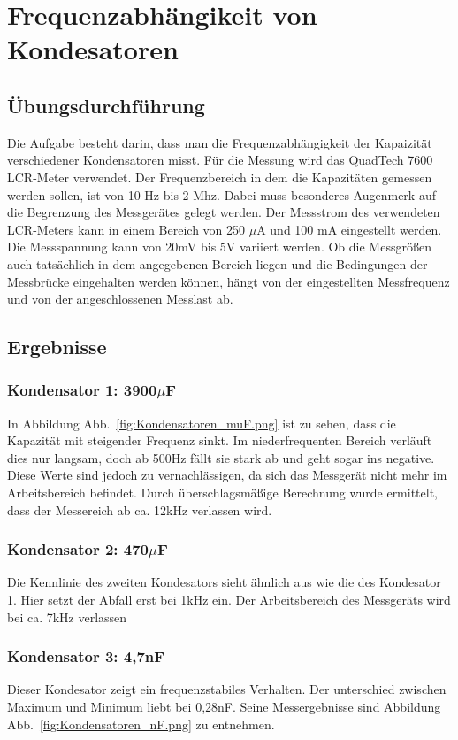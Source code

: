 \documentclass[a4paper,twoside,12pt,DIV=13,BCOR=5mm,numbers=noenddot,cleardoublepage=empty]{scrbook}
\begin{document}
    \section{Frequenzabh\"angikeit von Kondesatoren}
    \subsection{\"Ubungsdurchf\"uhrung}
    Die Aufgabe besteht darin, dass man die Frequenzabh\"angigkeit der Kapaizit\"at verschiedener Kondensatoren misst.
    F\"ur die Messung wird das QuadTech 7600 LCR-Meter verwendet. Der 
    Frequenzbereich in dem die Kapazit\"aten gemessen werden sollen, 
    ist von 10 Hz bis 2 Mhz. Dabei muss besonderes Augenmerk auf die 
    Begrenzung des Messger\"ates gelegt werden. Der Messstrom des verwendeten 
    LCR-Meters kann in einem Bereich von 250 $\mu$A und 100 mA eingestellt 
    werden. Die Messspannung kann von 20mV bis 5V variiert werden. Ob die 
    Messgr\"o\ss{}en auch tats\"achlich in dem angegebenen Bereich liegen und die 
    Bedingungen der Messbr\"ucke eingehalten werden k\"onnen, h\"angt von der
    eingestellten Messfrequenz und von der angeschlossenen Messlast ab.
    
    \subsection{Ergebnisse}
    \subsubsection{Kondensator 1: 3900$\mu$F }
    In Abbildung Abb.~\ref{fig:Kondensatoren_muF.png} ist zu sehen, dass die Kapazit\"at mit steigender Frequenz sinkt. Im 
    niederfrequenten Bereich verl\"auft dies nur langsam, doch ab 500Hz f\"allt sie stark ab und geht 
    sogar ins negative. Diese Werte sind jedoch zu vernachl\"assigen, da sich das Messger\"at nicht mehr 
    im Arbeitsbereich befindet. Durch \"uberschlagsm\"a\ss{}ige Berechnung wurde ermittelt, dass der Messereich ab 
    ca. 12kHz verlassen wird.
    \subsubsection{Kondensator 2: 470$\mu$F }
    Die Kennlinie des zweiten Kondesators sieht \"ahnlich aus wie die des Kondesator 1. Hier setzt der Abfall 
    erst bei 1kHz ein. Der Arbeitsbereich des Messger\"ats wird bei ca. 7kHz verlassen
    \subsubsection{Kondensator 3: 4,7nF }
    Dieser Kondesator zeigt ein frequenzstabiles Verhalten. Der unterschied zwischen Maximum und Minimum liebt 
    bei 0,28nF. Seine Messergebnisse sind Abbildung Abb.~\ref{fig:Kondensatoren_nF.png} zu entnehmen.
\end{document}
